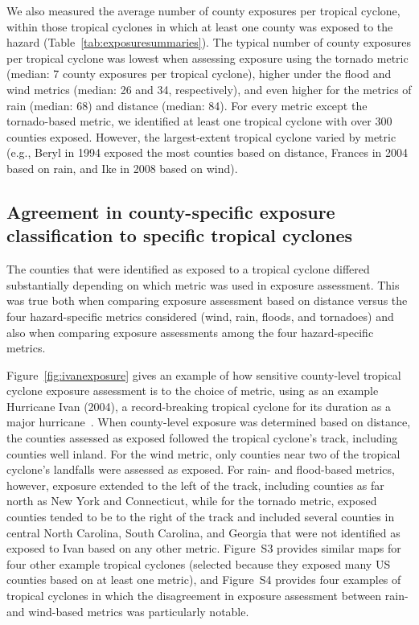 We also measured the average number of county exposures per tropical cyclone,
within those tropical cyclones in which at least one county was exposed to the
hazard (Table~\ref{tab:exposuresummaries}). The typical number of county
exposures per tropical cyclone was lowest when assessing exposure using the
tornado metric (median: 7 county exposures per tropical cyclone), higher under
the flood and wind metrics (median: 26 and 34, respectively), and even higher for the metrics of rain (median: 68)
and distance (median: 84).  For every metric except the tornado-based metric,
we identified at least one tropical cyclone with over 300 counties exposed.
However, the largest-extent tropical cyclone varied by metric (e.g., Beryl in
1994 exposed the most counties based on distance, Frances in 2004 based on
rain, and Ike in 2008 based on wind).

\subsection*{Agreement in county-specific exposure classification to specific
tropical cyclones}

The counties that were identified as exposed to a tropical cyclone differed
substantially depending on which metric was used in exposure assessment.  This
was true both when comparing exposure assessment based on distance versus the
four hazard-specific metrics considered (wind, rain, floods, and tornadoes)
and also when comparing exposure assessments among the four hazard-specific
metrics. 

Figure~\ref{fig:ivanexposure} gives an example of how sensitive county-level
tropical cyclone exposure assessment is to the choice of metric, using as an
example Hurricane Ivan (2004), a record-breaking tropical cyclone for its
duration as a major hurricane~\citep{franklin2006atlantic}. When county-level
exposure was determined based on distance, the counties assessed as exposed
followed the tropical cyclone's track, including counties well inland. For the
wind metric, only counties near two of the tropical cyclone's landfalls were
assessed as exposed. For rain- and flood-based metrics, however, exposure
extended to the left of the track, including counties as far north as New York
and Connecticut, while for the tornado metric, exposed counties tended to be to
the right of the track and included several counties in central North Carolina,
South Carolina, and Georgia that were not identified as exposed to Ivan based
on any other metric.  Figure~S3 provides similar maps for four other example
tropical cyclones (selected because they exposed many \ac{US}  counties based on
at least one metric), and Figure~S4 provides four examples of tropical cyclones
in which the disagreement in exposure assessment between rain- and wind-based
metrics was particularly notable.


